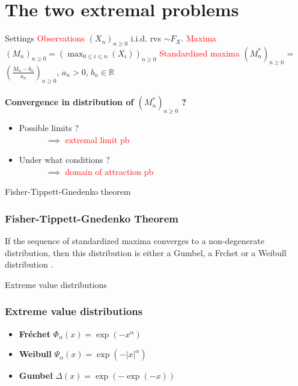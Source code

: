 \documentclass{beamer}
\begin{document}
\section{The two extremal problems}
\begin{frame}{Settings}
	\textcolor{red}{Observations} $(X_n)_{n \ge 0}$ i.i.d. rvs $\sim F_X$. \newline 
	\textcolor{red}{Maxima} $(M_n)_{n \ge 0} = (\max_{0 \le i \le n}(X_i))_{n \ge 0}$ \newline
	\textcolor{red}{Standardized maxima} $(M^{*}_n)_{n \ge 0}$ = $(\frac{M_n - b_n}{a_n})_{n \ge 0}$, $a_n > 0$, $b_n \in \mathbb{R}$ \newline \\ \\
	\textbf{Convergence in distribution of $(M^{*}_n)_{n \ge 0}$ ?}
	\begin{itemize}
		\item Possible limits ? \\
		\textcolor{white}{Alinea} $\implies$ \textcolor{red}{extremal limit pb} 
		\item Under what conditions ? \\
		\textcolor{white}{Alinea} $\implies$ \textcolor{red}{domain of attraction pb} 
	\end{itemize}
	
\end{frame}

\begin{frame}{Fisher-Tippett-Gnedenko theorem}
	\frametitle{Fisher-Tippett-Gnedenko Theorem}
	\begin{theorem}
		If the sequence of standardized maxima converges to a non-degenerate distribution, then this distribution is either a Gumbel, a Frchet or a Weibull distribution .
	\end{theorem}
\end{frame}

\begin{frame}{Extreme value distributions}
	\frametitle{Extreme value distributions}
	\begin{itemize}
		\item \textbf{Fr\'{e}chet} $\Phi_\alpha(x) = \exp(- x^\alpha)$ \newline
		\item \textbf{Weibull} $\Psi_\alpha(x) = \exp(-  \lvert x \rvert^\alpha)$ \newline
		\item \textbf{Gumbel} $\Delta(x) = \exp(- \exp(- x))$
	\end{itemize}
\end{frame}
\end{document}
